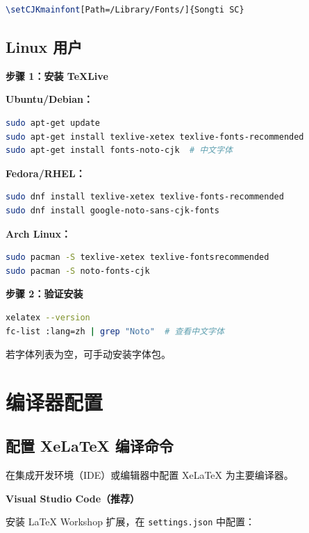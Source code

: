 \begin{lstlisting}[style=blockstyle,language=TeX]
\setCJKmainfont[Path=/Library/Fonts/]{Songti SC}
\end{lstlisting}

\subsection{Linux 用户}

\textbf{步骤 1：安装 TeXLive}

\textbf{Ubuntu/Debian：}
\begin{lstlisting}[style=blockstyle,language=bash]
sudo apt-get update
sudo apt-get install texlive-xetex texlive-fonts-recommended
sudo apt-get install fonts-noto-cjk  # 中文字体
\end{lstlisting}

\textbf{Fedora/RHEL：}
\begin{lstlisting}[style=blockstyle,language=bash]
sudo dnf install texlive-xetex texlive-fonts-recommended
sudo dnf install google-noto-sans-cjk-fonts
\end{lstlisting}

\textbf{Arch Linux：}
\begin{lstlisting}[style=blockstyle,language=bash]
sudo pacman -S texlive-xetex texlive-fontsrecommended
sudo pacman -S noto-fonts-cjk
\end{lstlisting}

\textbf{步骤 2：验证安装}

\begin{lstlisting}[style=blockstyle,language=bash]
xelatex --version
fc-list :lang=zh | grep "Noto"  # 查看中文字体
\end{lstlisting}

若字体列表为空，可手动安装字体包。

\section{编译器配置}

\subsection{配置 XeLaTeX 编译命令}

在集成开发环境（IDE）或编辑器中配置 XeLaTeX 为主要编译器。

\textbf{Visual Studio Code（推荐）}

安装 LaTeX Workshop 扩展，在 \lstinline|settings.json| 中配置：

